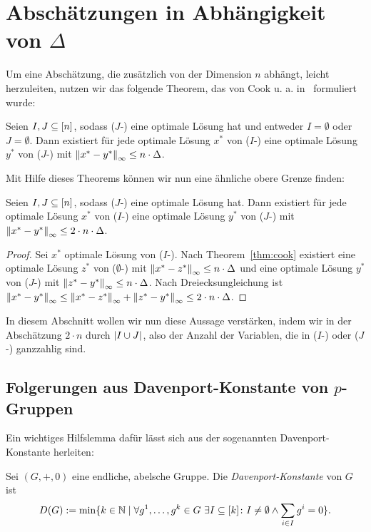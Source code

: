 
\section{Abschätzungen in Abhängigkeit von $\Delta$}

Um eine Abschätzung, die zusätzlich von der Dimension $n$ abhängt, leicht herzuleiten, nutzen wir das folgende Theorem, das von Cook u. a. in~\cite[Theorem 1 und Bemerkung 1]{Cook1986} formuliert wurde:

\begin{theorem}[Cook u. a., 1986]\label{thm:cook}
	Seien $I, J\subseteq[n]$, sodass ($J$-\MIP) eine optimale Lösung hat und entweder $I=\emptyset$ oder $J=\emptyset$.
	Dann existiert für jede optimale Lösung $x^*$ von ($I$-\MIP) eine optimale Lösung $y^*$ von ($J$-\MIP) mit $\left\lVert x^*-y^*\right\rVert_\infty\leq n\cdot\Delta$.
\end{theorem}

Mit Hilfe dieses Theorems können wir nun eine ähnliche obere Grenze finden:
\begin{corollary}
	Seien $I,J\subseteq[n]$, sodass ($J$-\MIP) eine optimale Lösung
	hat. Dann existiert für jede optimale Lösung $x^*$ von ($I$-\MIP) eine optimale Lösung $y^*$ von ($J$-\MIP) mit $\left\lVert x^*-y^*\right\rVert_\infty\leq2\cdot n\cdot\Delta$.
\end{corollary}
\begin{proof}
	Sei $x^*$ optimale Lösung von ($I$-\MIP).
	Nach Theorem~\ref{thm:cook} existiert eine optimale Lösung $z^*$ von ($\emptyset$-\MIP) mit $\left\lVert x^*-z^*\right\rVert_\infty\leq n\cdot\Delta$ und eine optimale Lösung $y^*$ von ($J$-\MIP) mit $\left\lVert z^*-y^*\right\rVert_\infty\leq n\cdot\Delta$.
	Nach Dreiecksungleichung ist $\left\lVert x^*-y^*\right\rVert_\infty\leq\left\lVert x^*-z^*\right\rVert_\infty+\left\lVert z^*-y^*\right\rVert_\infty\leq 2\cdot n\cdot\Delta$.
\end{proof}

In diesem Abschnitt wollen wir nun diese Aussage verstärken, indem wir in der Abschätzung $2\cdot n$ durch $\lvert I\cup J \rvert$, also der Anzahl der Variablen, die in ($I$-\MIP) oder ($J$-\MIP) ganzzahlig sind.

\subsection{Folgerungen aus Davenport-Konstante von $p$-Gruppen}

Ein wichtiges Hilfslemma dafür lässt sich aus der sogenannten Davenport-Konstante herleiten:

\begin{definition}
	Sei $(G,+,0)$ eine endliche, abelsche Gruppe. Die {\em Davenport-Konstante} von $G$ ist
	$$
		D(G):=\min\{k\in\mathbb{N} \mid \forall g^1,\dots,g^k \in G~\exists I\subseteq[k]\colon I\neq\emptyset \wedge \sum_{i\in I}g^i=0  \} .
	$$
\end{definition}

